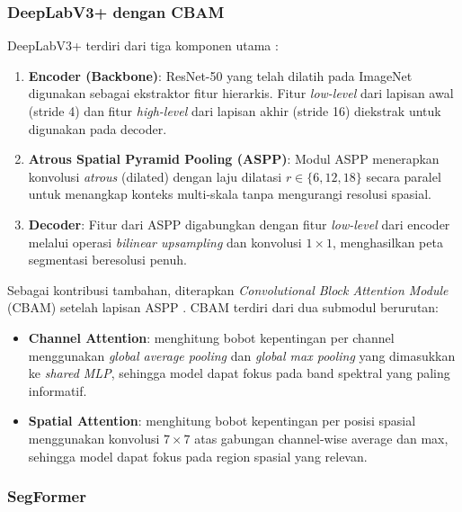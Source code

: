 \subsubsection{DeepLabV3+ dengan CBAM}

DeepLabV3+ terdiri dari tiga komponen utama \citep{chen2018deeplabv3}:

\begin{enumerate}
    \item \textbf{Encoder (Backbone)}: ResNet-50 yang telah dilatih pada ImageNet digunakan sebagai ekstraktor fitur hierarkis. Fitur \textit{low-level} dari lapisan awal (stride 4) dan fitur \textit{high-level} dari lapisan akhir (stride 16) diekstrak untuk digunakan pada decoder.

    \item \textbf{Atrous Spatial Pyramid Pooling (ASPP)}: Modul ASPP menerapkan konvolusi \textit{atrous} (dilated) dengan laju dilatasi $r \in \{6, 12, 18\}$ secara paralel untuk menangkap konteks multi-skala tanpa mengurangi resolusi spasial.

    \item \textbf{Decoder}: Fitur dari ASPP digabungkan dengan fitur \textit{low-level} dari encoder melalui operasi \textit{bilinear upsampling} dan konvolusi $1\times1$, menghasilkan peta segmentasi beresolusi penuh.
\end{enumerate}

Sebagai kontribusi tambahan, diterapkan \textit{Convolutional Block Attention Module} (CBAM) setelah lapisan ASPP \citep{hsu2022}. CBAM terdiri dari dua submodul berurutan:

\begin{itemize}
    \item \textbf{Channel Attention}: menghitung bobot kepentingan per channel menggunakan \textit{global average pooling} dan \textit{global max pooling} yang dimasukkan ke \textit{shared MLP}, sehingga model dapat fokus pada band spektral yang paling informatif.
    \item \textbf{Spatial Attention}: menghitung bobot kepentingan per posisi spasial menggunakan konvolusi $7\times7$ atas gabungan channel-wise average dan max, sehingga model dapat fokus pada region spasial yang relevan.
\end{itemize}

\subsubsection{SegFormer}

